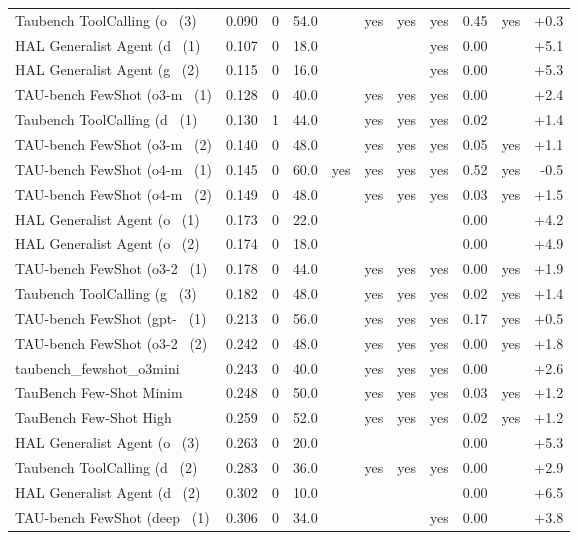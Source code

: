 {\begin{longtable}{lrrrcccccrr}
Taubench ToolCalling (o~ (3) & 0.090 & 0 & 54.0 &  & yes & yes & yes & 0.45 & yes & +0.3 \\
HAL Generalist Agent (d~ (1) & 0.107 & 0 & 18.0 &  &  &  & yes & 0.00 &  & +5.1 \\
HAL Generalist Agent (g~ (2) & 0.115 & 0 & 16.0 &  &  &  & yes & 0.00 &  & +5.3 \\
TAU-bench FewShot (o3-m~ (1) & 0.128 & 0 & 40.0 &  & yes & yes & yes & 0.00 &  & +2.4 \\
Taubench ToolCalling (d~ (1) & 0.130 & 1 & 44.0 &  & yes & yes & yes & 0.02 &  & +1.4 \\
TAU-bench FewShot (o3-m~ (2) & 0.140 & 0 & 48.0 &  & yes & yes & yes & 0.05 & yes & +1.1 \\
TAU-bench FewShot (o4-m~ (1) & 0.145 & 0 & 60.0 & yes & yes & yes & yes & 0.52 & yes & -0.5 \\
TAU-bench FewShot (o4-m~ (2) & 0.149 & 0 & 48.0 &  & yes & yes & yes & 0.03 & yes & +1.5 \\
HAL Generalist Agent (o~ (1) & 0.173 & 0 & 22.0 &  &  &  &  & 0.00 &  & +4.2 \\
HAL Generalist Agent (o~ (2) & 0.174 & 0 & 18.0 &  &  &  &  & 0.00 &  & +4.9 \\
TAU-bench FewShot (o3-2~ (1) & 0.178 & 0 & 44.0 &  & yes & yes & yes & 0.00 & yes & +1.9 \\
Taubench ToolCalling (g~ (3) & 0.182 & 0 & 48.0 &  & yes & yes & yes & 0.02 & yes & +1.4 \\
TAU-bench FewShot (gpt-~ (1) & 0.213 & 0 & 56.0 &  & yes & yes & yes & 0.17 & yes & +0.5 \\
TAU-bench FewShot (o3-2~ (2) & 0.242 & 0 & 48.0 &  & yes & yes & yes & 0.00 & yes & +1.8 \\
taubench\_fewshot\_o3mini~ & 0.243 & 0 & 40.0 &  & yes & yes & yes & 0.00 &  & +2.6 \\
TauBench Few-Shot Minim~ & 0.248 & 0 & 50.0 &  & yes & yes & yes & 0.03 & yes & +1.2 \\
TauBench Few-Shot High ~ & 0.259 & 0 & 52.0 &  & yes & yes & yes & 0.02 & yes & +1.2 \\
HAL Generalist Agent (o~ (3) & 0.263 & 0 & 20.0 &  &  &  &  & 0.00 &  & +5.3 \\
Taubench ToolCalling (d~ (2) & 0.283 & 0 & 36.0 &  & yes & yes & yes & 0.00 &  & +2.9 \\
HAL Generalist Agent (d~ (2) & 0.302 & 0 & 10.0 &  &  &  &  & 0.00 &  & +6.5 \\
TAU-bench FewShot (deep~ (1) & 0.306 & 0 & 34.0 &  &  &  & yes & 0.00 &  & +3.8 \\

\end{longtable}}
